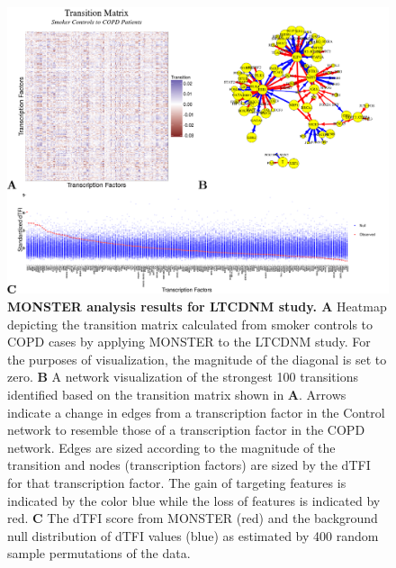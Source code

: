 \begin{figure}
\includegraphics[width=1\linewidth]{figures/figure2LTCDNM}
\caption[MONSTER analysis results for LTCDNM study]{\textbf{MONSTER analysis results for LTCDNM study. A } Heatmap depicting the transition matrix calculated from smoker controls to COPD cases by applying MONSTER to the LTCDNM study. For the purposes of visualization, the magnitude of the diagonal is set to zero. \textbf{B} A network visualization of the strongest 100 transitions identified based on the transition matrix shown in \textbf{A}. Arrows indicate a change in edges from a transcription factor in the Control network to resemble those of a transcription factor in the COPD network. Edges are sized according to the magnitude of the transition and nodes (transcription factors) are sized by the dTFI for that transcription factor. The gain of targeting features is indicated by the color blue while the loss of features is indicated by red. \textbf{C} The dTFI score from MONSTER (red) and the background null distribution of dTFI values (blue) as estimated by 400 random sample permutations of the data.}
\label{fig:figure2LTCDNM}
\end{figure}


